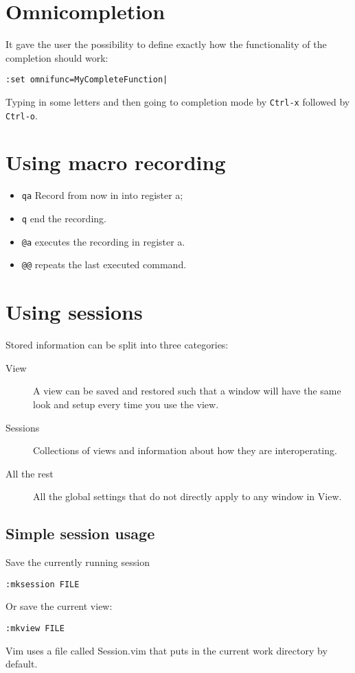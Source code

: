 \documentclass[11pt]{book}
\begin{document}
\section{Omnicompletion}
It gave the user the possibility to define exactly how the functionality of the
completion should work:
\begin{verbatim}
:set omnifunc=MyCompleteFunction|
\end{verbatim}
Typing in some letters and then going to completion mode by \verb|Ctrl-x|
followed by \verb|Ctrl-o|.
\section{Using macro recording}
\begin{itemize}
    \item \verb|qa| Record from now in into register a;
    \item \verb|q| end the recording.
    \item \verb|@a| executes the recording in register a.
    \item \verb|@@| repeats the last executed command.
\end{itemize}

\section{Using sessions}
Stored information can be split into three categories:
\begin{description}
\item [View] A view can be saved and restored such that a window will have the
same look and setup every time you use the view.
\item [Sessions] Collections of views and information about how they are
interoperating.
\item [All the rest] All the global settings that do not directly apply to any
window in View.
\end{description}
\subsection{Simple session usage}
Save the currently running session
\begin{verbatim}
:mksession FILE
\end{verbatim}
Or save the current view:
\begin{verbatim}
:mkview FILE
\end{verbatim}
Vim uses a file called Session.vim that puts in the current work directory by
default.
\end{document}
